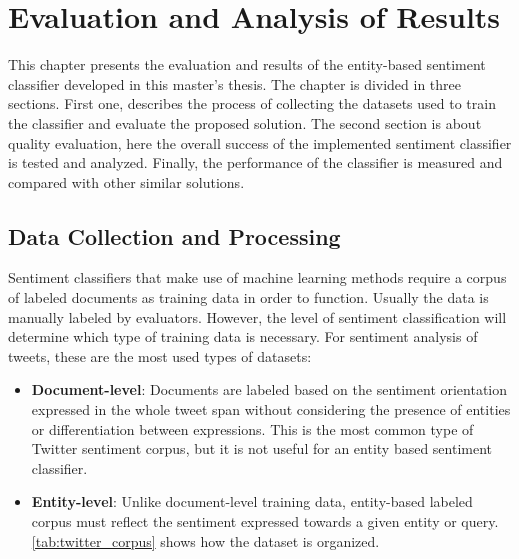 \chapter{Evaluation and Analysis of Results}
\label{sec:evaluation}

This chapter presents the evaluation and results of the entity-based sentiment classifier developed in this master's thesis. The chapter is divided in three sections. First one, describes the process of collecting the datasets used to train the classifier and evaluate the proposed solution. The second section is about quality evaluation,  here the overall success of the implemented sentiment classifier is tested and analyzed. Finally, the performance of the classifier is measured and compared with other similar solutions. 

\section{Data Collection and Processing}
\label{sec:collection}

Sentiment classifiers that make use of machine learning methods require a corpus of labeled documents as training data in order to function. Usually the data is manually labeled by evaluators. However, the level of sentiment classification will determine which type of training data is necessary. For sentiment analysis of tweets, these are the most used types of datasets:

\begin{itemize} 
\itemsep0em  

\item \textbf{Document-level}: Documents are labeled based on the sentiment orientation expressed in the whole tweet span without considering the presence of entities or differentiation between expressions. This is the most common type of Twitter sentiment corpus, but it is not useful for an entity based sentiment classifier.

\item \textbf{Entity-level}: Unlike document-level training data, entity-based labeled corpus must reflect the sentiment expressed towards a given entity or query. \autoref{tab:twitter_corpus} shows how the dataset is organized.

\end{itemize}

